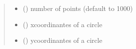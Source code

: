 \documentclass[letterpaper,10pt,english]{sphinxmanual}
\begin{document}
\begin{fulllineitems}
\begin{quote}
\begin{description}
\begin{itemize}
\item {} 
\sphinxAtStartPar
{} () \textendash{} number of points (default to 1000)

\end{itemize}

\sphinxAtStartPar
\begin{itemize}
\item {} 
\sphinxAtStartPar
{} () \textendash{} x\sphinxhyphen{}coordinantes of a circle

\item {} 
\sphinxAtStartPar
{} () \textendash{} y\sphinxhyphen{}coordinantes of a circle

\end{itemize}


\end{description}\end{quote}

\end{fulllineitems}

\end{document}
